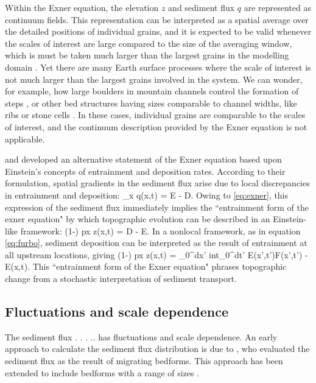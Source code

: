 Within the Exner equation, the elevation $z$ and sediment flux $q$ are represented as continuum fields. This representation can be interpreted as a spatial average over the detailed positions of individual grains, and it is expected to be valid whenever the scales of interest are large compared to the size of the averaging window, which is must be taken much larger than the largest grains in the modelling domain \citep{Coleman2009}. 
Yet there are many Earth surface processes where the scale of interest is not much larger than the largest grains involved in the system. We can wonder, for example, how large boulders in mountain channels control the formation of steps \citep{Chin1999,Zimmermann2010, Comiti2012, Saletti2020}, or other bed structures having sizes comparable to channel widths, like ribs or stone cells \citep{Hassan2008,Venditti2017}. In these cases, individual grains are comparable to the scales of interest, and the continuum description provided by the Exner equation is not applicable.

\citet{Nakagawa1976} and \citet{Tsujimoto1978} developed an alternative statement of the Exner equation based upon Einstein's concepts of entrainment and deposition rates.
According to their formulation, spatial gradients in the sediment flux arise due to local discrepancies in entrainment and deposition:
\be \partial_x q(x,t) = E - D. \ee 
Owing to \ref{eq:exner}, this expression of the sediment flux immediately implies the ``entrainment form of the exner equation" \citep{Parker2000,Furbish2012,Fathel2015,Furbish2017} by which topographic evolution can be described in an Einstein-like framework: 
\be (1-\phi) px z(x,t) = D - E.\ee
In a nonlocal framework, as in equation \ref{eq:furbo}, sediment deposition can be interpreted as the result of entrainment at all upstream locations, giving
\be (1-\phi) px z(x,t) = \int_0^\infty dx' int_0^\infty dt' E(x',t')F(x',t') - E(x,t). \ee
This ``entrainment form of the Exner equation" \citep{Furbish2017} phrases topographic change from a stochastic interpretation of sediment transport.

\subsection{Fluctuations and scale dependence}

The sediment flux . . . .. has fluctuations and scale dependence. 
An early approach to calculate the sediment flux distribution is due to \citet{Hamamori1962}, who evaluated the sediment flux as the result of migrating bedforms. This approach has been extended to include bedforms with a range of sizes \citep{Guala2014,Nikora1997}.


